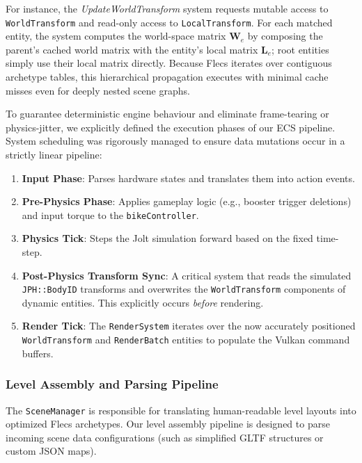 \documentclass[acmtog, nonacm]{acmart}
\begin{document}
For instance, the \textit{UpdateWorldTransform} system requests mutable access to \texttt{WorldTransform} and read-only access to \texttt{LocalTransform}. For each matched entity, the system computes the world-space matrix $\mathbf{W}_e$ by composing the parent's cached world matrix with the entity's local matrix $\mathbf{L}_e$; root entities simply use their local matrix directly. Because Flecs iterates over contiguous archetype tables, this hierarchical propagation executes with minimal cache misses even for deeply nested scene graphs.

To guarantee deterministic engine behaviour and eliminate frame-tearing or physics-jitter, we explicitly defined the execution phases of our ECS pipeline. System scheduling was rigorously managed to ensure data mutations occur in a strictly linear pipeline:
\begin{enumerate}
    \item \textbf{Input Phase}: Parses hardware states and translates them into action events.
    \item \textbf{Pre-Physics Phase}: Applies gameplay logic (e.g., booster trigger deletions) and input torque to the \texttt{bikeController}.
    \item \textbf{Physics Tick}: Steps the Jolt simulation forward based on the fixed time-step.
    \item \textbf{Post-Physics Transform Sync}: A critical system that reads the simulated \texttt{JPH::BodyID} transforms and overwrites the \texttt{WorldTransform} components of dynamic entities. This explicitly occurs \textit{before} rendering.
    \item \textbf{Render Tick}: The \texttt{RenderSystem} iterates over the now accurately positioned \texttt{WorldTransform} and \texttt{RenderBatch} entities to populate the Vulkan command buffers.
\end{enumerate}

\subsubsection{Level Assembly and Parsing Pipeline}
The \texttt{SceneManager} is responsible for translating human-readable level layouts into optimized Flecs archetypes. Our level assembly pipeline is designed to parse incoming scene data configurations (such as simplified GLTF structures or custom JSON maps). 
\end{document}
